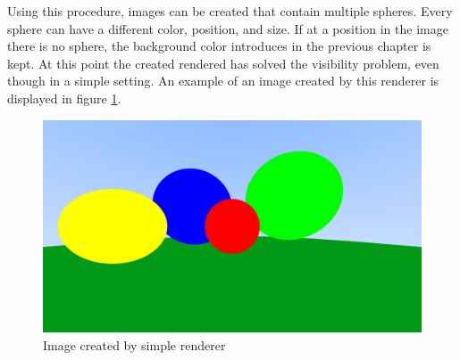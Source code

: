 \documentclass[12pt]{report}
\begin{document}
Using this procedure, images can be created that contain multiple spheres. Every sphere can have a different color, position, and size. If at a position in the image there is no sphere, the background color introduces in the previous chapter is kept. At this point the created rendered has solved the visibility problem, even though in a simple setting. An example of an image created by this renderer is displayed in figure \ref{fig:step3}.
\begin{figure}[h!]
\includegraphics[width=\textwidth]{step3}
\centering
\caption{Image created by simple renderer}
\label{fig:step3}
\end{figure}
\end{document}
